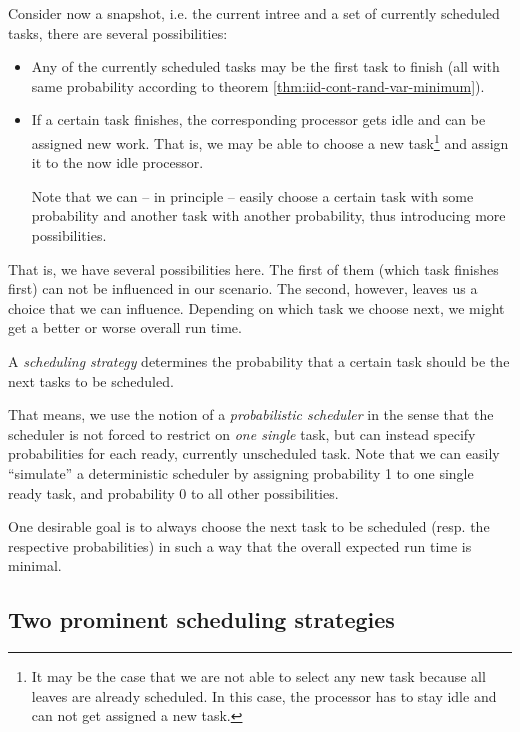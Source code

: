 Consider now a snapshot, i.e. the current intree and a set of currently scheduled tasks, there are several possibilities:

\begin{itemize}
\item Any of the currently scheduled tasks may be the first task to finish (all with same probability according to theorem \ref{thm:iid-cont-rand-var-minimum}).
\item If a certain task finishes, the corresponding processor gets idle and can be assigned new work. That is, we may be able to choose a new task\footnote{It may be the case that we are not able to select any new task because all leaves are already scheduled. In this case, the processor has to stay idle and can not get assigned a new task.} and assign it to the now idle processor.

  Note that we can -- in principle -- easily choose a certain task with some probability and another task with another probability, thus introducing more possibilities.
\end{itemize}

That is, we have several possibilities here. The first of them (which task finishes first) can not be influenced in our scenario. The second, however, leaves us a choice that we can influence. Depending on which task we choose next, we might get a better or worse overall run time.

\begin{definition}
  A \emph{scheduling strategy} determines the probability that a certain task should be the next tasks to be scheduled.
\end{definition}

That means, we use the notion of a \emph{probabilistic scheduler} in the sense that the scheduler is not forced to restrict on \emph{one single} task, but can instead specify probabilities for each ready, currently unscheduled task. Note that we can easily ``simulate'' a deterministic scheduler by assigning probability 1 to one single ready task, and probability 0 to all other possibilities.

One desirable goal is to always choose the next task to be scheduled (resp. the respective probabilities) in such a way that the overall expected run time is minimal.

\subsection{Two prominent scheduling strategies}
\label{sec:intro-two-scheduling-strategies}

